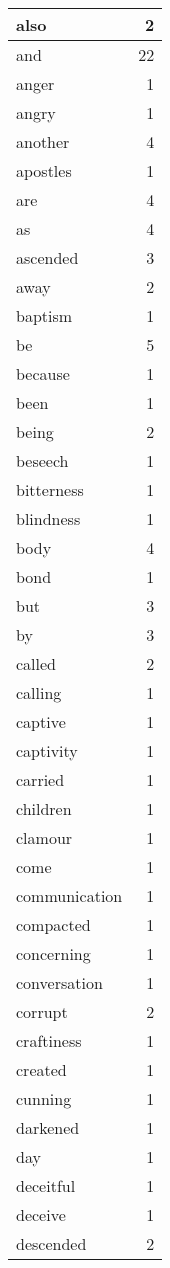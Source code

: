 \begin{center}
\begin{longtable}{l|r}
also & 2\\ \hline 
and & 22\\ \hline 
anger & 1\\ \hline 
angry & 1\\ \hline 
another & 4\\ \hline 
apostles & 1\\ \hline 
are & 4\\ \hline 
as & 4\\ \hline 
ascended & 3\\ \hline 
away & 2\\ \hline 
baptism & 1\\ \hline 
be & 5\\ \hline 
because & 1\\ \hline 
been & 1\\ \hline 
being & 2\\ \hline 
beseech & 1\\ \hline 
bitterness & 1\\ \hline 
blindness & 1\\ \hline 
body & 4\\ \hline 
bond & 1\\ \hline 
but & 3\\ \hline 
by & 3\\ \hline 
called & 2\\ \hline 
calling & 1\\ \hline 
captive & 1\\ \hline 
captivity & 1\\ \hline 
carried & 1\\ \hline 
children & 1\\ \hline 
clamour & 1\\ \hline 
come & 1\\ \hline 
communication & 1\\ \hline 
compacted & 1\\ \hline 
concerning & 1\\ \hline 
conversation & 1\\ \hline 
corrupt & 2\\ \hline 
craftiness & 1\\ \hline 
created & 1\\ \hline 
cunning & 1\\ \hline 
darkened & 1\\ \hline 
day & 1\\ \hline 
deceitful & 1\\ \hline 
deceive & 1\\ \hline 
descended & 2\\ \hline 

\end{longtable}
\end{center}
